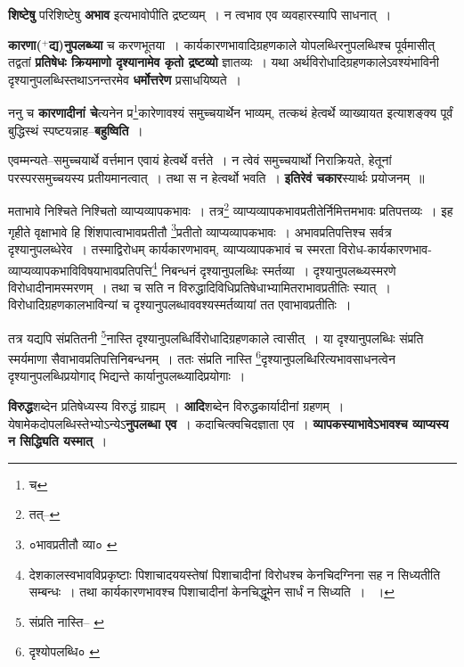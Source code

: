 \documentclass[article,12pt,a4paper]{memoir}
\newcommand{\add}[1]{($^{+}$#1)}
\begin{document}
	  \pstart \textbf{शिष्टेषु} परिशिष्टेषु \textbf{अभाव} इत्यभावोपीति द्रष्टव्यम् । न त्वभाव एव व्यवहारस्यापि साधनात् ।
	\pend
      

	  \pstart \textbf{कारणा\add{द्य}नुपलब्ध्या} च करणभूतया । कार्यकारणभावादिग्रहणकाले योपलब्धिरनुपलब्धिश्च पूर्वमासीत् तद्वतां \textbf{प्रतिषेधः क्रियमाणो दृश्यानामेव कृतो द्रष्टव्यो} ज्ञातव्यः । यथा अर्थविरोधादिग्रहणकालेऽवश्यंभाविनी दृश्यानुपलब्धिस्तथाऽनन्तरमेव \textbf{धर्मोत्तरेण} प्रसाधयिष्यते ।
	\pend
      

	  \pstart ननु च \textbf{कारणादीनां चे}त्यनेन प्र\footnote{च}कारेणावश्यं समुच्चयार्थेन भाव्यम्, तत्कथं हेत्वर्थे व्याख्यायत इत्याशङ्क्य पूर्वं बुद्धिस्थं स्पष्टयन्नाह--\textbf{बहुष्विति} ।
	\pend
      

	  \pstart एवम्मन्यते--समुच्चयार्थे वर्त्तमान एवायं हेत्वर्थे वर्त्तते । न त्वेवं समुच्चयार्थो निराक्रियते, हेतूनां परस्परसमुच्चयस्य प्रतीयमानत्वात् । तथा स न हेत्वर्थो भवति । \textbf{इतिरेवं चकार}स्यार्थः प्रयोजनम् ॥
	\pend
      \leavevmode{}
	  \bigskip
	  \begingroup
	

	  \pstart मताभावे निश्चिते निश्चितो व्याप्यव्यापकभावः । तत्र\footnote{तत्--\cite{dp-msC}} व्याप्यव्यापकभावप्रतीतेर्निमित्तमभावः प्रतिपत्तव्यः । इह गृहीते वृक्षाभावे हि शिंशपात्वाभावप्रतीतौ \footnote{०भावप्रतीतौ व्या० \cite{dp-msB}}प्रतीतो व्याप्यव्यापकभावः । अभावप्रतिपत्तिश्च सर्वत्र दृश्यानुपलब्धेरेव । तस्माद्विरोधम् कार्यकारणभावम्, व्याप्यव्यापकभावं च स्मरता विरोध-कार्यकारणभाव-व्याप्यव्यापकभाविविषयाभावप्रतिपत्ति\footnote{देशकालस्वभावविप्रकृष्टाः पिशाचादययस्तेषां पिशाचादीनां विरोधश्च केनचिदग्निना सह न सिध्यतीति सम्बन्धः । तथा कार्यकारणभावश्च पिशाचादीनां केनचिद्धूमेन सार्धं न सिध्यति । \cite{dp-msD-n} ।} निबन्धनं दृश्यानुपलब्धिः स्मर्तव्या । दृश्यानुपलब्ध्यस्मरणे विरोधादीनामस्मरणम् । तथा च सति न विरुद्धादिविधिप्रतिषेधाभ्यामितराभावप्रतीतिः स्यात् । विरोधादिग्रहणकालभाविन्यां च दृश्यानुपलब्धाववश्यस्मर्तव्यायां तत एवाभावप्रतीतिः ।
	\pend
       

	  \pstart तत्र यद्यपि संप्रतितनी \footnote{संप्रति नास्ति--\cite{dp-msA} \cite{dp-edP} \cite{dp-edH} \cite{dp-edE} \cite{dp-edN}}नास्ति दृश्यानुपलब्धिर्विरोधादिग्रहणकाले त्वासीत् । या दृश्यानुपलब्धिः संप्रति स्मर्यमाणा सैवाभावप्रतिपत्तिनिबन्धनम् । ततः संप्रति नास्ति \footnote{दृश्योपलब्धि० \cite{dp-msA} \cite{dp-msB} \cite{dp-edP} \cite{dp-edH} \cite{dp-edE} \cite{dp-edN}}दृश्यानुपलब्धिरित्यभावसाधनत्वेन दृश्यानुपलब्धिप्रयोगाद् भिद्यन्ते कार्यानुपलब्ध्यादिप्रयोगाः ।
	\pend
      
	  \endgroup
	

	  \pstart \textbf{विरुद्ध}शब्देन प्रतिषेध्यस्य विरुद्धं ग्राह्यम् । \textbf{आदि}शब्देन विरुद्धकार्यादीनां ग्रहणम् । येषामेकदोपलब्धिस्तेभ्योऽन्येऽ\textbf{नुपलब्धा एव} । कदाचित्क्वचिदज्ञाता एव । \textbf{व्यापकस्याभावेऽभावश्च व्याप्यस्य न सिद्ध्यिति यस्मात्} ।
	\pend
      
\end{document}
